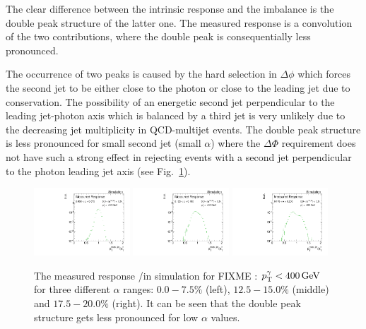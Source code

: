 The clear difference between the intrinsic response and the imbalance is the double peak structure of the latter one. The measured response is a convolution of the two
contributions, where the double peak is consequentially less pronounced.

The occurrence of two peaks is caused by the hard selection in $\Delta \phi$ which forces the second jet to be either close to the photon or close to the leading jet 
due to \pt conservation. 
The possibility of an energetic second jet perpendicular to the leading jet-photon axis which is balanced by a third jet is very unlikely 
due to the decreasing jet multiplicity in QCD-multijet events.
The double peak structure is less pronounced for small second jet \pt (small $\alpha$) where the $\Delta \Phi$ requirement does not have such a strong effect in rejecting
events with a second jet perpendicular to the photon leading jet axis (see \mbox{Fig. \ref{fig:alphaBins}}).

\begin{figure}[bt]
 \centering
     \includegraphics[width=0.32\textwidth]{figures/resolution/methodology/fullResponse_1_alpha_bin.pdf}
     \includegraphics[width=0.32\textwidth]{figures/resolution/methodology/fullResponse_4_alpha_bin.pdf}
     \includegraphics[width=0.32\textwidth]{figures/resolution/methodology/fullResponse_6_alpha_bin.pdf}
  \caption{The measured response \ptrecojet/\ptgamma in simulation for FIXME : ${p}_\mathrm{T}^{\gamma} < 400 \,\text{Ge}\kern-0.06667em\text{V}$ for three different $\alpha$ ranges: $0.0-7.5\%$ (left), $12.5-15.0\%$ (middle) and $17.5-20.0\%$ (right). 
           It can be seen that the double peak structure gets less pronounced for low $\alpha$ values.}  
 \label{fig:alphaBins}
\end{figure}

